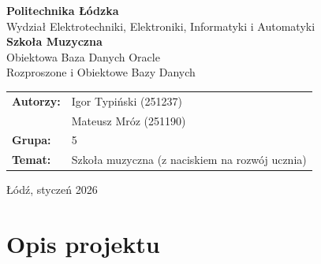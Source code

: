 \documentclass[12pt,a4paper]{article}
\begin{document}
\begin{titlepage}
    \centering
    \vspace*{1cm}

    {\Large\textbf{Politechnika Łódzka}}\\[0.3cm]
    {\large Wydział Elektrotechniki, Elektroniki, Informatyki i Automatyki}\\[2cm]

    {\Huge\textbf{Szkoła Muzyczna}}\\[0.5cm]
    {\Large Obiektowa Baza Danych Oracle}\\[1cm]

    {\large Rozproszone i Obiektowe Bazy Danych}\\[3cm]

    \begin{tabular}{ll}
        \textbf{Autorzy:} & Igor Typiński (251237) \\
                          & Mateusz Mróz (251190) \\[0.5cm]
        \textbf{Grupa:}   & 5 \\[0.5cm]
        \textbf{Temat:}   & Szkoła muzyczna (z naciskiem na rozwój ucznia)
    \end{tabular}

    \vfill
    {\large Łódź, styczeń 2026}
\end{titlepage}

\tableofcontents
\newpage

\section{Opis projektu}
\end{document}
